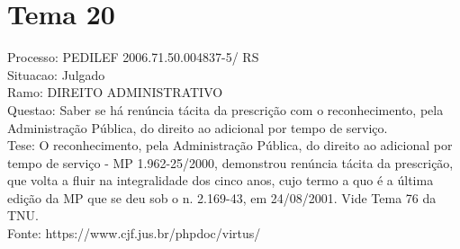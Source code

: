 \documentclass[12pt]{article}
\begin{document}
\section*{Tema 20}
Processo: PEDILEF 2006.71.50.004837-5/ RS\\
Situacao: Julgado\\
Ramo: DIREITO ADMINISTRATIVO\\
Questao: Saber se há renúncia tácita da prescrição com o reconhecimento, pela Administração Pública, do direito ao adicional por tempo de serviço.\\
Tese: O reconhecimento, pela Administração Pública, do direito ao adicional por tempo de serviço - MP 1.962-25/2000, demonstrou renúncia tácita da prescrição, que volta a fluir na integralidade dos cinco anos, cujo termo a quo é a última edição da MP que se deu sob o n. 2.169-43, em 24/08/2001. Vide Tema 76 da TNU.\\
Fonte: https://www.cjf.jus.br/phpdoc/virtus/
\end{document}
